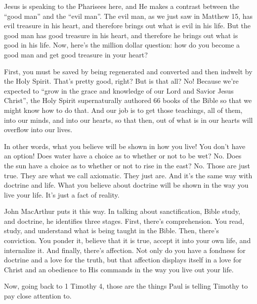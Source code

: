 \documentclass[letterpaper, 12pt]{article}
\begin{document}
    Jesus is speaking to the Pharisees here, and He makes a contrast
    between the ``good man'' and the ``evil man''. The evil man, as we
    just saw in Matthew 15, has evil treasure in his heart, and
    therefore brings out what is evil in his life. But the good man has
    good treasure in his heart, and therefore he brings out what is good
    in his life. Now, here's the million dollar question: how do you
    become a good man and get good treasure in your heart? 

    First, you must be saved by being regenerated and converted and then
    indwelt by the Holy Spirit. That's pretty good, right? But is that
    all? No! Because we're expected to ``grow in the grace and knowledge
    of our Lord and Savior Jesus Christ'', the Holy Spirit
    supernaturally authored 66 books of the Bible so that we might know
    how to do that. And our job is to get those teachings, all of them,
    into our minds, and into our hearts, so that then, out of what is in
    our hearts will overflow into our lives. 

    In other words, what you believe will be shown in how you live! You
    don't have an option! Does water have a choice as to whether or not
    to be wet? No. Does the sun have a choice as to whether or not to
    rise in the east? No. Those are just true. They are what we call
    axiomatic. They just are. And it's the same way with doctrine and
    life. What you believe about doctrine will be shown in the way you
    live your life. It's just a fact of reality. 

    John MacArthur puts it this way. In talking about sanctification,
    Bible study, and doctrine, he identifies three stages. First,
    there's comprehension. You read, study, and understand what is being
    taught in the Bible. Then, there's conviction. You ponder it,
    believe that it is true, accept it into your own life, and
    internalize it. And finally, there's affection. Not only do you have
    a fondness for doctrine and a love for the truth, but that affection
    displays itself in a love for Christ and an obedience to His
    commands in the way you live out your life.

    Now, going back to 1 Timothy 4, those are the things Paul is telling
    Timothy to pay close attention to.
\end{document}
